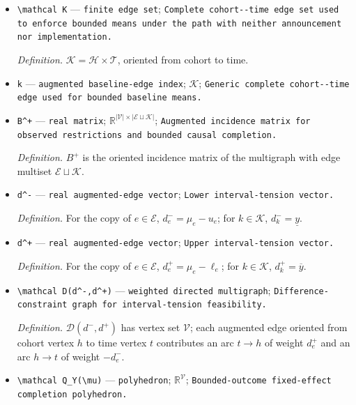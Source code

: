 \documentclass{article}
\begin{document}
\begin{itemize}
  \item \texttt{\textbackslash{}\allowbreak{}mathcal K} --- \texttt{finite edge set}; \texttt{Complete cohort-\allowbreak{}-\allowbreak{}time edge set used to enforce bounded means under the path with neither announcement nor implementation.}
  \par\smallskip\noindent\emph{Definition.} \(\mathcal K=\mathcal H\times\mathcal T\), oriented from cohort to time.
  \item \texttt{k} --- \texttt{augmented baseline-\allowbreak{}edge index}; \(\mathcal K\); \texttt{Generic complete cohort-\allowbreak{}-\allowbreak{}time edge used for bounded baseline means.}
  \item \texttt{B\textasciicircum{}+\allowbreak{}} --- \texttt{real matrix}; \(\mathbb R^{|\mathcal V|\times|\mathcal E\sqcup\mathcal K|}\); \texttt{Augmented incidence matrix for observed restrictions and bounded causal completion.}
  \par\smallskip\noindent\emph{Definition.} \(B^+\) is the oriented incidence matrix of the multigraph with edge multiset \(\mathcal E\sqcup\mathcal K\).
  \item \texttt{d\textasciicircum{}-\allowbreak{}} --- \texttt{real augmented-\allowbreak{}edge vector}; \texttt{Lower interval-\allowbreak{}tension vector.}
  \par\smallskip\noindent\emph{Definition.} For the copy of \(e\in\mathcal E\), \(d^-_e=\mu_e-u_e\); for \(k\in\mathcal K\), \(d^-_k=\underline y\).
  \item \texttt{d\textasciicircum{}+\allowbreak{}} --- \texttt{real augmented-\allowbreak{}edge vector}; \texttt{Upper interval-\allowbreak{}tension vector.}
  \par\smallskip\noindent\emph{Definition.} For the copy of \(e\in\mathcal E\), \(d^+_e=\mu_e-\ell_e\); for \(k\in\mathcal K\), \(d^+_k=\overline y\).
  \item \texttt{\textbackslash{}\allowbreak{}mathcal D(d\textasciicircum{}-\allowbreak{},\allowbreak{}d\textasciicircum{}+\allowbreak{})} --- \texttt{weighted directed multigraph}; \texttt{Difference-\allowbreak{}constraint graph for interval-\allowbreak{}tension feasibility.}
  \par\smallskip\noindent\emph{Definition.} \(\mathcal D(d^-,d^+)\) has vertex set \(\mathcal V\); each augmented edge oriented from cohort vertex \(h\) to time vertex \(t\) contributes an arc \(t\to h\) of weight \(d^+_e\) and an arc \(h\to t\) of weight \(-d^-_e\).
  \item \texttt{\textbackslash{}\allowbreak{}mathcal Q\_\allowbreak{}Y(\textbackslash{}\allowbreak{}mu)} --- \texttt{polyhedron}; \(\mathbb R^{\mathcal V}\); \texttt{Bounded-\allowbreak{}outcome fixed-\allowbreak{}effect completion polyhedron.}

\end{itemize}
\end{document}

